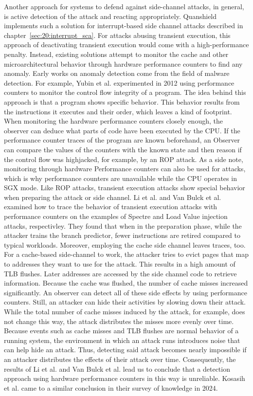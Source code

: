 Another approach for systems to defend against side-channel attacks, in general, is active detection of the attack and
reacting appropriately. Quanshield implements such a solution for interrupt-based side channel
attacks described in chapter~\ref{sec:20:interrupt_sca}. For attacks abusing transient execution, this approach of
deactivating transient execution would come with a high-performance penalty. Instead, existing solutions attempt to
monitor the cache and other microarchitectural behavior through hardware performance counters to find any anomaly. Early
works on anomaly detection come from the field of malware detection. For example, Yubin et al. experimented in 2012
using performance counters to monitor the control flow integrity of a program. \cite{yubin_xia_cfimon_2012} The idea
behind this approach is that a program shows specific behavior. This behavior results from the instructions it executes
and their order, which leaves a kind of footprint. When monitoring the hardware performance counters closely enough, the
observer can deduce what parts of code have been executed by the CPU. If the performance counter traces of the program
are known beforehand, an Observer can compare the values of the counters with the known state and then reason if the
control flow was highjacked, for example, by an ROP attack. As a side note, monitoring through hardware Performance
counters can also be used for attacks, which is why performance counters are unavailable while the CPU operates in SGX
mode. \cite{uhsadel2008exploiting,costan2016intel}
Like ROP attacks, transient execution attacks show special behavior when preparing the attack or side channel.
Li et al. and Van Bulck et al. examined how to trace the behavior of transient execution attacks with performance
counters on the examples of Spectre and Load Value injection attacks, respectivley.
\cite{li_detecting_2021, van_bulck_lvi_2020}
They found that when in the preparation phase, while the attacker trains the branch predictor, fewer instructions are
retired compared to typical workloads. Moreover, employing the cache side channel leaves traces, too. For a cache-based
side-channel to work, the attacker tries to evict pages that map to addresses they want to use for the attack. This
results in a high amount of TLB flushes. Later addresses are accessed by the side channel code to retrieve information.
Because the cache was flushed, the number of cache misses increased significantly. An observer can detect all of these
side effects by using performance counters. Still, an attacker can hide their activities by slowing down their attack.
While the total number of cache misses induced by the attack, for example, does not change this way, the attack
distributes the misses more evenly over time. Because events such as cache misses and TLB flushes are normal behavior of
a running system, the environment in which an attack runs introduces noise that can help hide an attack. Thus, detecting
said attack becomes nearly impossible if an attacker distributes the effects of their attack over time. Consequently,
the results of Li et al. and Van Bulck et al. lead us to conclude that a detection approach using hardware performance
counters in this way is unreliable. Kosasih et al. came to a similar conclusion in their survey of knowledge in
2024.\cite{kosasih2024sok}
